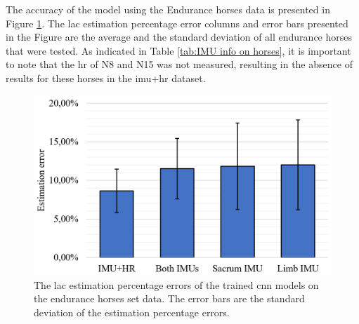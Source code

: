  The accuracy of the model using the Endurance horses data is presented in Figure \ref{results_fatigue_endur}. The \gls{lac} estimation percentage error columns and error bars presented in the Figure are the average and the standard deviation of all endurance horses that were tested. As indicated in Table \ref{tab:IMU info on horses}, it is important to note that the \gls{hr} of N8 and N15 was not measured, resulting in the absence of results for these horses in the \gls{imu}+\gls{hr} dataset. 

\begin{figure}[htb]
\centering
\includegraphics[width=.65\linewidth]{chapters/fatigue/figures/Picture8.png}
\caption{The \gls{lac} estimation percentage errors of the trained \gls{cnn} models on the endurance horses \gls{set} data. The error bars are the standard deviation of the estimation percentage errors.}
\label{results_fatigue_endur}
\end{figure}
 